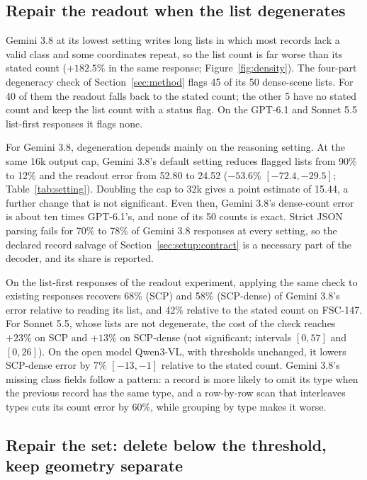 

\subsection{Repair the readout when the list degenerates}\label{sec:res:degen}



Gemini 3.8 at its lowest setting writes long lists in which most records lack a valid class and some coordinates repeat, so the list count is far worse than its stated count ($+182.5\%$ in the same response; Figure~\ref{fig:density}). The four-part degeneracy check of Section~\ref{sec:method} flags 45 of its 50 dense-scene lists. For 40 of them the readout falls back to the stated count; the other 5 have no stated count and keep the list count with a status flag. On the GPT-6.1 and Sonnet 5.5 list-first responses it flags none.

For Gemini 3.8, degeneration depends mainly on the reasoning setting. At the same 16k output cap, Gemini 3.8's default setting reduces flagged lists from 90\% to 12\% and the readout error from 52.80 to 24.52 ($-53.6\%$ $[-72.4,-29.5]$; Table~\ref{tab:setting}). Doubling the cap to 32k gives a point estimate of 15.44, a further change that is not significant. Even then, Gemini 3.8's dense-count error is about ten times GPT-6.1's, and none of its 50 counts is exact. Strict JSON parsing fails for 70\% to 78\% of Gemini 3.8 responses at every setting, so the declared record salvage of Section~\ref{sec:setup:contract} is a necessary part of the decoder, and its share is reported.

On the list-first responses of the readout experiment, applying the same check to existing responses recovers 68\% (SCP) and 58\% (SCP-dense) of Gemini 3.8's error relative to reading its list, and 42\% relative to the stated count on FSC-147. For Sonnet 5.5, whose lists are not degenerate, the cost of the check reaches $+23\%$ on SCP and $+13\%$ on SCP-dense (not significant; intervals $[0,57]$ and $[0,26]$). On the open model Qwen3-VL, with thresholds unchanged, it lowers SCP-dense error by 7\% $[-13,-1]$ relative to the stated count. Gemini 3.8's missing class fields follow a pattern: a record is more likely to omit its type when the previous record has the same type, and a row-by-row scan that interleaves types cuts its count error by 60\%, while grouping by type makes it worse.

\subsection{Repair the set: delete below the threshold, keep geometry separate}\label{sec:res:set}

